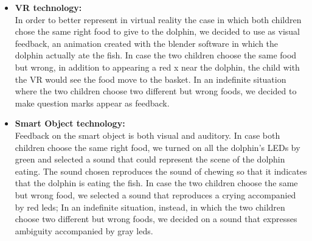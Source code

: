 \documentclass [12pt]{article}
\begin{document}
\begin{itemize}[•]
\item \textbf{VR technology:}\\
In order to better represent in virtual reality the case in which both children chose the same right food to give to the dolphin, we decided to use as visual feedback, an animation created with the blender software in which the dolphin actually ate the fish. In case the two children choose the same food but wrong, in addition to appearing a red x near the dolphin, the child with the VR would see the food move to the basket. In an indefinite situation where the two children choose two different but wrong foods, we decided to make question marks appear as feedback.
\item \textbf{Smart Object technology:}\\
Feedback on the smart object is both visual and auditory. In case both children choose the same right food, we turned on all the dolphin's LEDs by green and selected a sound that could represent the scene of the dolphin eating. The sound chosen reproduces the sound of chewing so that it indicates that the dolphin is eating the fish.   In case the two children choose the same but wrong food, we selected a sound that reproduces a crying accompanied by red leds; In an indefinite situation, instead, in which the two children choose two different but wrong foods, we decided on a sound that expresses ambiguity accompanied by gray leds.
\end{itemize}
\end{document}
